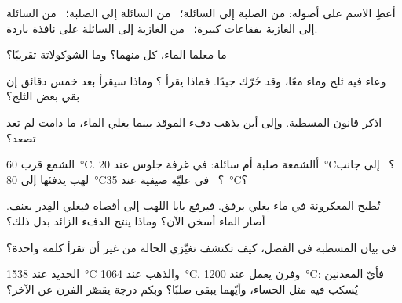 \begin{exercise}[$\star$]\label{exo:g4:changes-of-state:1}
أعطِ الاسم على أصوله: من الصلبة إلى السائلة؛ \ من السائلة إلى
الصلبة؛ \ من السائلة إلى الغازية بفقاعات كبيرة؛ \ من الغازية إلى
السائلة على نافذة باردة.
\end{exercise}

\begin{exercise}[$\star$]\label{exo:g4:changes-of-state:2}
ما معلما الماء،  كل منهما؟ وما  الشوكولاتة
تقريبًا؟
\end{exercise}

\begin{exercise}[$\star$]\label{exo:g4:changes-of-state:3}
وعاء فيه ثلج وماء معًا، وقد حُرّك جيدًا. فماذا يقرأ ؟ وماذا سيقرأ بعد خمس دقائق إن بقي بعض الثلج؟
\end{exercise}

\begin{exercise}[$\star$]\label{exo:g4:changes-of-state:4}
اذكر قانون المسطبة. وإلى أين يذهب دفء الموقد بينما يغلي الماء،
ما دامت  لم تعد تصعد؟
\end{exercise}

\begin{exercise}[$\star$]\label{exo:g4:changes-of-state:5}
الشمع  قرب \qty{60}{\celsius}. أالشمعة صلبة أم سائلة: في
غرفة جلوس عند \qty{20}{\celsius}؟ \ إلى جانب لهب يدفئها إلى
\qty{80}{\celsius}؟ \ في عليّة صيفية عند \qty{35}{\celsius}؟
\end{exercise}

\begin{exercise}[$\star$]\label{exo:g4:changes-of-state:6}
تُطبخ المعكرونة في ماء يغلي برفق. فيرفع بابا اللهب إلى أقصاه
فيغلي القِدر بعنف. أصار الماء أسخن الآن؟ وماذا ينتج الدفء الزائد
بدل ذلك؟
\end{exercise}

\begin{exercise}[$\star$]\label{exo:g4:changes-of-state:7}
في بيان المسطبة في الفصل، كيف تكتشف تغيّرَي الحالة من غير أن
تقرأ كلمة واحدة؟
\end{exercise}

\begin{exercise}[$\star$]\label{exo:g4:changes-of-state:8}
 الحديد عند \qty{1538}{\celsius} والذهب عند
\qty{1064}{\celsius}. وفرن يعمل عند \qty{1200}{\celsius}: فأيّ
المعدنين يُسكب فيه مثل الحساء، وأيّهما يبقى صلبًا؟ وبكم درجة
يقصّر الفرن عن الآخر؟
\end{exercise}

